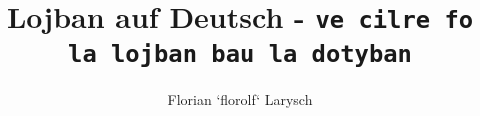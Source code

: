 \title{Lojban auf Deutsch - \texttt{ve cilre fo la lojban bau la dotyban}}
\author{Florian `florolf` Larysch}

\maketitle

\tableofcontents
